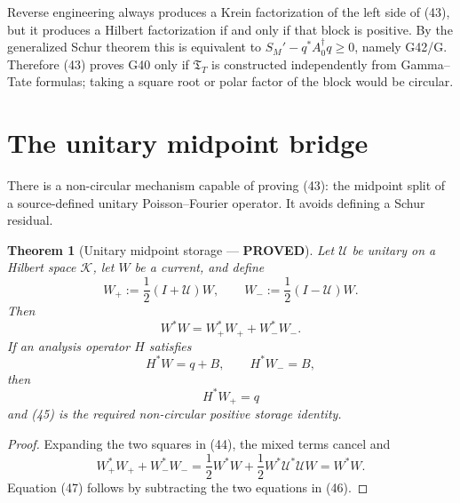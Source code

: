 \documentclass[11pt]{article}
\newtheorem{theorem}{Theorem}
\newcommand{\PROVED}{\textcolor{green!45!black}{\textbf{PROVED}}}
\begin{document}
Reverse engineering always produces a Krein factorization of the left side of
(43), but it produces a Hilbert factorization if and only if that block is
positive.  By the generalized Schur theorem this is equivalent to
$S_M'-q^*A_0^\dagger q\ge0$, namely G42/G.  Therefore (43) proves G40 only if
$\mathfrak T_T$ is constructed independently from Gamma--Tate formulas; taking
a square root or polar factor of the block would be circular.

\section{The unitary midpoint bridge}

There is a non-circular mechanism capable of proving (43): the midpoint split
of a source-defined unitary Poisson--Fourier operator.  It avoids defining a
Schur residual.

\begin{theorem}[Unitary midpoint storage --- \PROVED]
Let $\mathcal U$ be unitary on a Hilbert space $\mathcal K$, let $W$ be a
current, and define
\begin{equation}
 W_+:=\frac12(I+\mathcal U)W,
 \qquad
 W_-:=\frac12(I-\mathcal U)W.                           \tag{44}
\end{equation}
Then
\begin{equation}
 W^*W=W_+^*W_++W_-^*W_-.                               \tag{45}
\end{equation}
If an analysis operator $H$ satisfies
\begin{equation}
 H^*W=q+B,\qquad H^*W_-=B,                             \tag{46}
\end{equation}
then
\begin{equation}
 H^*W_+=q                                               \tag{47}
\end{equation}
and (45) is the required non-circular positive storage identity.
\end{theorem}

\begin{proof}
Expanding the two squares in (44), the mixed terms cancel and
\[
 W_+^*W_++W_-^*W_-
 =\frac12W^*W+\frac12W^*\mathcal U^*\mathcal UW=W^*W.
\]
Equation (47) follows by subtracting the two equations in (46).
\end{proof}
\end{document}
